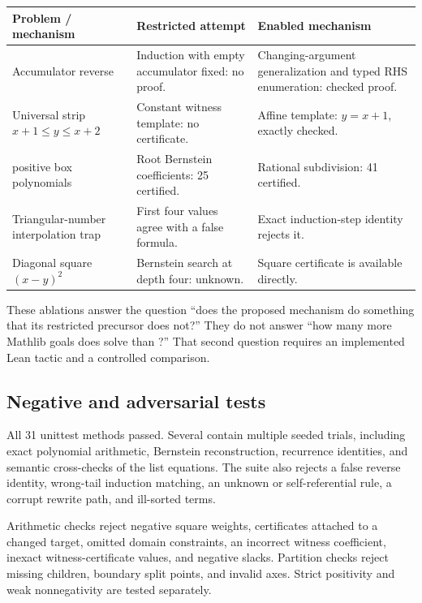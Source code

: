 \begin{longtable}{@{}>{\raggedright\arraybackslash}p{}>{\raggedright\arraybackslash}p{}>{\raggedright\arraybackslash}p{}@{}}
\toprule
Problem / mechanism & Restricted attempt & Enabled mechanism \\
\midrule
\endhead
Accumulator reverse & Induction with empty accumulator fixed: no proof. & Changing-argument generalization and typed RHS enumeration: checked proof. \\
Universal strip $x+1\le y\le x+2$ & Constant witness template: no certificate. & Affine template: $y=x+1$, exactly checked. \\
41 positive box polynomials & Root Bernstein coefficients: 25 certified. & Rational subdivision: 41 certified. \\
Triangular-number interpolation trap & First four values agree with a false formula. & Exact induction-step identity rejects it. \\
Diagonal square $(x-y)^2$ & Bernstein search at depth four: unknown. & Square certificate is available directly. \\
\bottomrule
\end{longtable}

These ablations answer the question ``does the proposed mechanism do something
that its restricted precursor does not?'' They do not answer ``how many more
Mathlib goals does \Forge{} solve than \Grind{}?'' That second question requires
an implemented Lean tactic and a controlled comparison.

\subsection{Negative and adversarial tests}

All 31 unittest methods passed. Several contain multiple seeded trials,
including exact polynomial arithmetic, Bernstein reconstruction, recurrence
identities, and semantic cross-checks of the list equations. The suite also
rejects a false reverse identity, wrong-tail induction matching, an unknown
or self-referential rule, a corrupt rewrite path, and ill-sorted terms.

Arithmetic checks reject negative square weights, certificates attached to a
changed target, omitted domain constraints, an incorrect witness coefficient,
inexact witness-certificate values, and negative slacks. Partition checks
reject missing children, boundary split points, and invalid axes. Strict
positivity and weak nonnegativity are tested separately.

